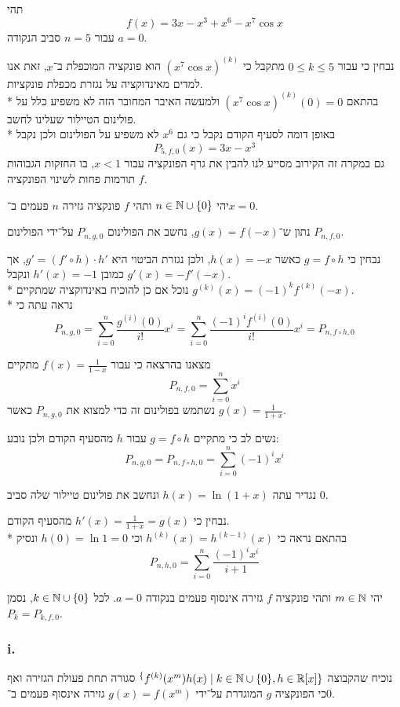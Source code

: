 \Subquestion{}
תהי
\[
	f(x) = 3x - x^3 + x^6 - x^7 \cos x
\]
עבור $n = 5$ סביב הנקודה $a = 0$.

נבחין כי עבור $0 \le k \le 5$ מתקבל כי ${(x^7 \cos x)}^{(k)}$ הוא פונקציה המוכפלת ב־$x$, זאת אנו למדים מאינדוקציה על נגזרת מכפלת פונקציות. \\*
בהתאם ${(x^7 \cos x)}^{(k)}(0) = 0$ ולמעשה האיבר המחובר הזה לא משפיע כלל על פולינום הטיילור שעלינו לחשב. \\*
באופן דומה לסעיף הקודם נקבל כי גם $x^6$ לא משפיע על הפולינום ולכן נקבל
\[
	P_{5, f, 0}(x) = 3x - x^3
\]
גם במקרה זה הקירוב מסייע לנו להבין את גרף הפונקציה עבור $x < 1$, בו החזקות הגבוהות תורמות פחות לשינוי הפונקציה $f$.

\Question{}
יהי $n \in \mathbb{N} \cup \{0\}$ ותהי $f$ פונקציה גזירה $n$ פעמים ב־$x = 0$.

\Subquestion{}
נתון ש־$g(x) = f(-x)$, נחשב את הפולינום $P_{n, g, 0}$ על־ידי הפולינום $P_{n, f, 0}$.

נבחין כי $g = f \circ h$ כאשר $h(x) = -x$, ולכן נגזרת הביטוי היא $g' = (f' \circ h) \cdot h'$, אך כמובן $h'(x) = -1$ ונקבל $g'(x) = -f'(-x)$. \\*
נוכל אם כן להוכיח באינדוקציה שמתקיים $g^{(k)}(x) = {(-1)}^k f^{(k)}(-x)$. \\*
נראה עתה כי
\[
	P_{n, g, 0}
	= \sum_{i = 0}^{n} \frac{g^{(i)}(0)}{i!} x^i
	= \sum_{i = 0}^{n} \frac{{(-1)}^i f^{(i)}(0)}{i!} x^i
	= P_{n, f \circ h, 0}
\]

\Subquestion{}
מצאנו בהרצאה כי עבור $f(x) = \frac{1}{1 - x}$ מתקיים
\[
	P_{n, f, 0} = \sum_{i = 0}^{n} x^i
\]
נשתמש בפולינום זה כדי למצוא את $P_{n, g, 0}$ כאשר $g(x) = \frac{1}{1 + x}$.

נשים לב כי מתקיים $g = f \circ h$ עבור $h$ מהסעיף הקודם ולכן נובע:
\[
	P_{n, g, 0}
	= P_{n, f \circ h, 0}
	= \sum_{i = 0}^{n} {(-1)}^i x^i
\]

\Subquestion{}
נגדיר עתה $h(x) = \ln(1 + x)$ ונחשב את פולינום טיילור שלה סביב $0$.

נבחין כי $h'(x) = \frac{1}{1 + x} = g(x)$ מהסעיף הקודם. \\*
בהתאם נראה כי $h^{(k)}(x) = h^{(k - 1)}(x)$ וכי $h(0) = \ln 1 = 0$ ונסיק
\[
	P_{n, h, 0}
	= \sum_{i = 0}^{n} \frac{{(-1)}^i x^i}{i + 1}
\]

\Question{}
יהי $m \in \mathbb{N}$ ותהי פונקציה $f$ גזירה אינסוף פעמים בנקודה $a = 0$.
לכל $k \in \mathbb{N} \cup \{0\}$, נסמן $P_k = P_{k, f, 0}$.

\Subquestion{}
\subsubsection{i.}
נוכיח שהקבוצה $\sp\{ f^{(k)}(x^m)h(x) \mid k \in \mathbb{N} \cup \{0\}, h \in \mathbb{R}[x]\}$ סגורה תחת פעולת הגזירה ואף כי הפונקציה $g$ המוגדרת על־ידי $g(x) = f(x^m)$ גזירה אינסוף פעמים ב־$0$.



